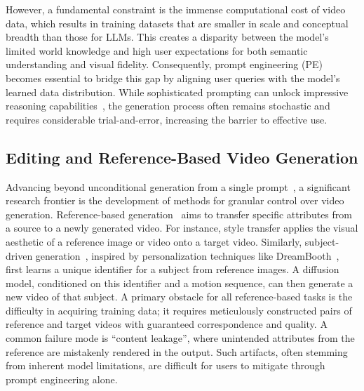 \documentclass{article}
\begin{document}
However, a fundamental constraint is the immense computational cost of video data, which results in training datasets that are smaller in scale and conceptual breadth than those for LLMs. This creates a disparity between the model's limited world knowledge and high user expectations for both semantic understanding and visual fidelity. Consequently, prompt engineering (PE)~\citep{liu2022design} becomes essential to bridge this gap by aligning user queries with the model's learned data distribution. While sophisticated prompting can unlock impressive reasoning capabilities~\citep{wiedemer2025video}, the generation process often remains stochastic and requires considerable trial-and-error, increasing the barrier to effective use.

\subsection{Editing and Reference-Based Video Generation}

Advancing beyond unconditional generation from a single prompt~\citep{team2025kling}, a significant research frontier is the development of methods for granular control over video generation. Reference-based generation~\citep{ku2024anyv2v} aims to transfer specific attributes from a source to a newly generated video. For instance, style transfer applies the visual aesthetic of a reference image or video onto a target video.
Similarly, subject-driven generation~\citep{team2025klingavatar}, inspired by personalization techniques like DreamBooth~\citep{ruiz2023dreambooth}, first learns a unique identifier for a subject from reference images. 
A diffusion model, conditioned on this identifier and a motion sequence, can then generate a new video of that subject. 
A primary obstacle for all reference-based tasks is the difficulty in acquiring training data; it requires meticulously constructed pairs of reference and target videos with guaranteed correspondence and quality. 
A common failure mode is ``content leakage'', where unintended attributes from the reference are mistakenly rendered in the output. Such artifacts, often stemming from inherent model limitations, are difficult for users to mitigate through prompt engineering alone.
\end{document}
